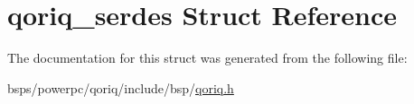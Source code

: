 \hypertarget{structqoriq__serdes}{}\section{qoriq\+\_\+serdes Struct Reference}
\label{structqoriq__serdes}


The documentation for this struct was generated from the following file\+:\begin{DoxyCompactItemize}
\item 
bsps/powerpc/qoriq/include/bsp/\mbox{\hyperlink{qoriq_8h}{qoriq.\+h}}\end{DoxyCompactItemize}
